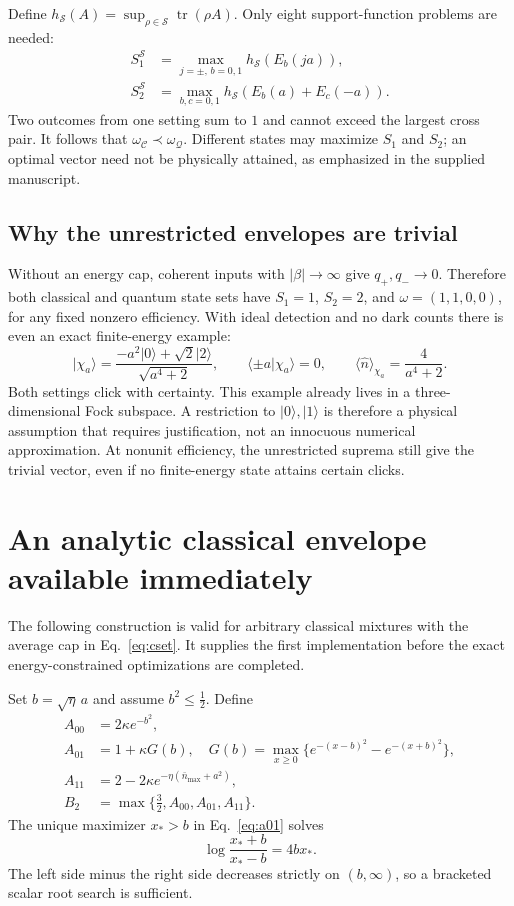 \documentclass[11pt,a4paper]{article}
\newcommand{\tr}{\operatorname{tr}}
\newcommand{\Cset}{\mathcal C}
\newcommand{\Qset}{\mathcal Q}
\newcommand{\nbar}{\bar n_{\max}}
\newcommand{\ket}[1]{\lvert #1\rangle}
\newcommand{\abs}[1]{\lvert #1\rvert}
\begin{document}
Define $h_{\mathcal S}(A)=\sup_{\rho\in\mathcal S}\tr(\rho A)$.
Only eight support-function problems are needed:
\begin{align}
 S_1^{\mathcal S}&=\max_{j=\pm,\,b=0,1}h_{\mathcal S}(E_b(ja)),\label{eq:s1}\\
 S_2^{\mathcal S}&=\max_{b,c=0,1}h_{\mathcal S}(E_b(a)+E_c(-a)).\label{eq:s2}
\end{align}
Two outcomes from one setting sum to $1$ and cannot exceed the largest cross
pair. It follows that $\omega_{\Cset}\prec\omega_{\Qset}$.
Different states may maximize $S_1$ and $S_2$; an optimal vector need not be
physically attained, as emphasized in the supplied manuscript.

\subsection{Why the unrestricted envelopes are trivial}
Without an energy cap, coherent inputs with $\abs\beta\to\infty$ give
$q_+,q_-\to0$. Therefore both classical and quantum state sets have
$S_1=1$, $S_2=2$, and $\omega=(1,1,0,0)$, for any fixed nonzero efficiency.
With ideal detection and no dark counts there is even an exact finite-energy
example:
\begin{equation}
 \ket{\chi_a}=\frac{-a^2\ket0+\sqrt2\ket2}{\sqrt{a^4+2}},
 \qquad \langle\pm a|\chi_a\rangle=0,
 \qquad \langle\hat n\rangle_{\chi_a}=\frac4{a^4+2}.
 \label{eq:darkstate}
\end{equation}
Both settings click with certainty. This example already lives in a
three-dimensional Fock subspace. A restriction to $\ket0,\ket1$ is therefore
a physical assumption that requires justification, not an innocuous numerical
approximation. At nonunit efficiency, the unrestricted suprema still give the
trivial vector, even if no finite-energy state attains certain clicks.

\section{An analytic classical envelope available immediately}
The following construction is valid for arbitrary classical mixtures with the
average cap in Eq.~\eqref{eq:cset}. It supplies the first implementation before
the exact energy-constrained optimizations are completed.

Set $b=\sqrt\eta\,a$ and assume $b^2\leq\tfrac12$. Define
\begin{align}
 A_{00}&=2\kappa e^{-b^2},\label{eq:a00}\\
 A_{01}&=1+\kappa G(b),\quad
 G(b)=\max_{x\geq0}\{e^{-(x-b)^2}-e^{-(x+b)^2}\},\label{eq:a01}\\
 A_{11}&=2-2\kappa e^{-\eta(\nbar+a^2)},\label{eq:a11}\\
 B_2&=\max\{\tfrac32,A_{00},A_{01},A_{11}\}.\label{eq:B2}
\end{align}
The unique maximizer $x_*>b$ in Eq.~\eqref{eq:a01} solves
\begin{equation}
 \log\frac{x_*+b}{x_*-b}=4bx_*.
 \label{eq:root}
\end{equation}
The left side minus the right side decreases strictly on $(b,\infty)$, so a
bracketed scalar root search is sufficient.
\end{document}
